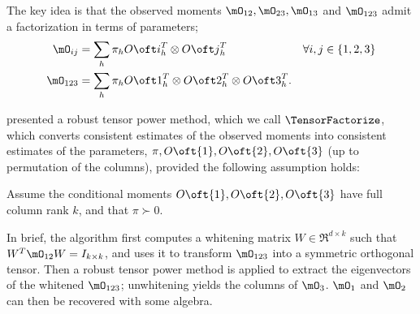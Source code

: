   The key idea is that the observed moments $\mO_{12}, \mO_{23}, \mO_{13}$ and
  $\mO_{123}$ admit a factorization in terms of parameters;
\begin{align*}
  \mO_{ij} &= \sum_h \pi_h {O\oft i}^T_h \otimes {O\oft j}^T_h & \forall i,j \in \{1,2,3\} \\
  \mO_{123} &= \sum_h \pi_h {O\oft 1}^T_h \otimes {O\oft 2}^T_h \otimes  {O\oft 3}^T_h.
\end{align*}

\citet{anandkumar13tensor} presented a robust tensor power method, which
  we call $\TensorFactorize$, which converts consistent estimates of the observed moments 
  into consistent estimates of the parameters, $\pi, O\oft{1},
  O\oft{2}, O\oft{3}$ (up to permutation of the columns), provided
  the following assumption holds:

\begin{assumption}
\label{asm:full-rank}
Assume the conditional moments $O\oft{1}, O\oft{2}, O\oft{3}$ have full column rank
  $k$, and that $\pi \succ 0$.
\end{assumption}

In brief, the algorithm first computes a whitening matrix $W \in
  \Re^{d \times k}$ such that $W^T \mO_{12} W = I_{k \times k}$,
  and uses it to transform $\mO_{123}$ into a symmetric orthogonal tensor.  
Then a robust tensor power method is applied to extract the eigenvectors
  of the whitened $\mO_{123}$; unwhitening yields the columns of $\mO_{3}$.
$\mO_1$ and $\mO_2$ can then be recovered with some algebra.

